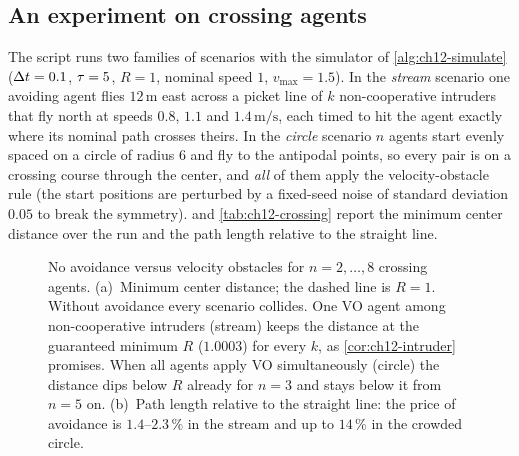 \subsection{An experiment on crossing agents}
\label{sec:ch12-experiment}

The script  runs two families of
scenarios with the simulator of \cref{alg:ch12-simulate} ($\Delta t = 0.1$,
$\tau = 5$, $R = 1$, nominal speed $1$, $v_{\max} = 1.5$). In the
\emph{stream} scenario one avoiding agent flies $12\,\mathrm{m}$ east across a
picket line of $k$ non-cooperative intruders that fly north at speeds
$0.8$, $1.1$ and $1.4\,\mathrm{m/s}$, each timed to hit the agent exactly where
its nominal path crosses theirs. In the \emph{circle} scenario $n$ agents start
evenly spaced on a circle of radius $6$ and fly to the antipodal points, so
every pair is on a crossing course through the center, and \emph{all} of them
apply the velocity-obstacle rule (the start positions are perturbed by a
fixed-seed noise of standard deviation $0.05$ to break the symmetry).
 and \cref{tab:ch12-crossing} report the minimum
center distance over the run and the path length relative to the straight
line.

\begin{figure}[tb]
  \centering
  \caption{No avoidance versus velocity obstacles for $n = 2, \dots, 8$
  crossing agents. (a)~Minimum center distance; the dashed line is $R = 1$.
  Without avoidance every scenario collides. One VO agent among
  non-cooperative intruders (stream) keeps the distance at the guaranteed
  minimum $R$ ($1.0003$) for every $k$, as \cref{cor:ch12-intruder} promises. When all agents apply VO
  simultaneously (circle) the distance dips below $R$ already for $n=3$ and
  stays below it from $n=5$ on.
  (b)~Path length relative to the straight line: the price of avoidance is
  $1.4$--$2.3\,\%$ in the stream and up to $14\,\%$ in the crowded circle.}
  \label{fig:ch12-crossing}
\end{figure}

